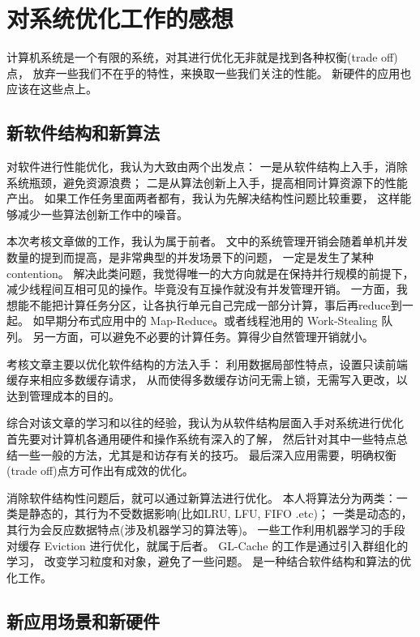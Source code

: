 \section{对系统优化工作的感想}

计算机系统是一个有限的系统，对其进行优化无非就是找到各种权衡(trade off)点，
放弃一些我们不在乎的特性，来换取一些我们关注的性能。
新硬件的应用也应该在这些点上。

\subsection{新软件结构和新算法}

对软件进行性能优化，我认为大致由两个出发点：
一是从软件结构上入手，消除系统瓶颈，避免资源浪费；
二是从算法创新上入手，提高相同计算资源下的性能产出。
如果工作任务里面两者都有，我认为先解决结构性问题比较重要，
这样能够减少一些算法创新工作中的噪音。

本次考核文章\cite{qiu_frozenhot_2023}做的工作，我认为属于前者。
文中的系统管理开销会随着单机并发数量的提到而提高，是非常典型的并发场景下的问题，
一定是发生了某种 contention。
解决此类问题，我觉得唯一的大方向就是在保持并行规模的前提下，
减少线程间互相可见的操作。毕竟没有互操作就没有并发管理开销。
一方面，我想能不能把计算任务分区，让各执行单元自己完成一部分计算，事后再reduce到一起。
如早期分布式应用中的 Map-Reduce。或者线程池用的 Work-Stealing 队列。
另一方面，可以避免不必要的计算任务。算得少自然管理开销就小。

考核文章主要以优化软件结构的方法入手：
利用数据局部性特点，设置只读前端缓存来相应多数缓存请求，
从而使得多数缓存访问无需上锁，无需写入更改，以达到管理成本的目的。

综合对该文章的学习和以往的经验，我认为从软件结构层面入手对系统进行优化
首先要对计算机各通用硬件和操作系统有深入的了解，
然后针对其中一些特点总结一些一般的方法，尤其是和访存有关的技巧。
最后深入应用需要，明确权衡(trade off)点方可作出有成效的优化。

消除软件结构性问题后，就可以通过新算法进行优化。
本人将算法分为两类：一类是静态的，其行为不受数据影响(比如LRU, LFU, FIFO .etc)；
一类是动态的，其行为会反应数据特点(涉及机器学习的算法等)。
一些工作利用机器学习的手段对缓存 Eviction 进行优化，就属于后者。
GL-Cache 的工作是通过引入群组化的学习，
改变学习粒度和对象，避免了一些问题\cite{yang_gl-cache_nodate}。
是一种结合软件结构和算法的优化工作。

\subsection{新应用场景和新硬件}

